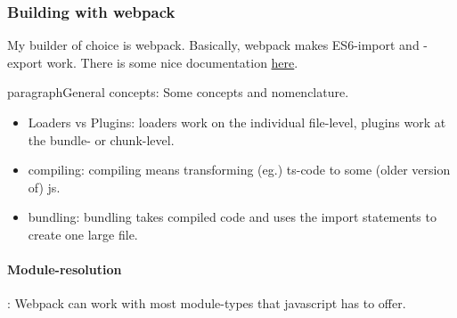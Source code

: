     

\subsubsection{Building with webpack}
My builder of choice is webpack. Basically, webpack makes ES6-import and -export work. There is some nice documentation \href{https://what-problem-does-it-solve.com/webpack/index.html}{here}.

paragraph{General concepts}: Some concepts and nomenclature.

\begin{itemize}
    \item Loaders vs Plugins: loaders work on the individual file-level, plugins work at the bundle- or chunk-level.
    \item compiling: compiling means transforming (eg.) ts-code to some (older version of) js.
    \item bundling: bundling takes compiled code and uses the import statements to create one large file.
\end{itemize}

\paragraph{Module-resolution}: Webpack can work with most module-types that javascript has to offer.

